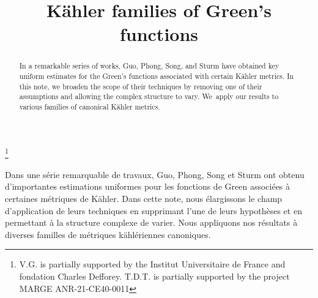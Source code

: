 \documentclass[JEP,XML,SOM,Unicode,published]{cedram}
\theoremstyle{definition}
\begin{document}
\frontmatter
\title{Kähler families of Green's functions}

\author[\initial{V.} \lastname{Guedj}]{ }
\address{Institut Universitaire de France et Institut de Mathématiques de Toulouse, Université de Toulouse,\\
118 route de Narbonne, 31400 Toulouse, France}

\author[\initial{T. D.} \lastname{Tô}]{ }
\address{Sorbonne Université, Institut de mathématiques de Jussieu – Paris Rive Gauche,\\
4, place Jussieu, 75252 Paris Cedex 05, France.}

\thanks{V.G. is partially supported by the Institut Universitaire de France and fondation Charles Defforey. T.D.T. is partially supported by the project MARGE ANR-21-CE40-0011}

\begin{abstract}
In a remarkable series of works, Guo, Phong, Song, and Sturm have obtained key uniform estimates for the Green's functions associated with certain Kähler metrics. In this note, we broaden the scope of their techniques by removing one of their assumptions and allowing the complex structure to vary. We~apply our results to various families of canonical Kähler metrics.
\end{abstract}





\begin{altabstract}
Dans une série remarquable de travaux, Guo, Phong, Song et Sturm ont obtenu d'importantes estimations uniformes pour les fonctions de Green associées à certaines métriques de Kähler. Dans cette note, nous élargissons le champ d'application de leurs techniques en supprimant l'une de leurs hypothèses et en permettant à la structure complexe de varier. Nous appliquons nos résultats à diverses familles de métriques kählériennes canoniques.
\end{altabstract}
\end{document}
